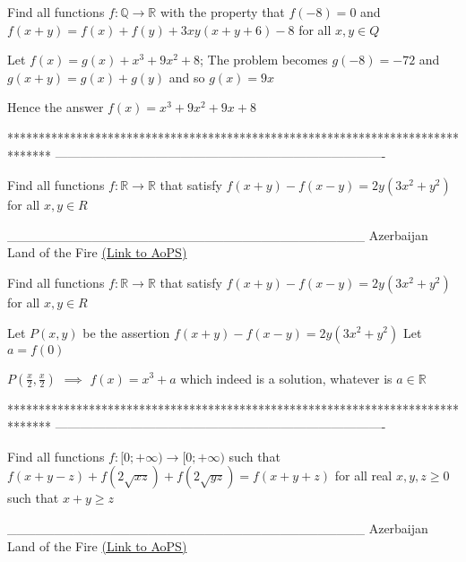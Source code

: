 \begin{solution}
	\begin{tcolorbox}Find all functions $f: \mathbb{Q}\to\mathbb{R}$ with the property  that $f(-8)=0$ and $f(x+y)=f(x)+f(y)+3xy(x+y+6)-8$ for all $x,y{\in}Q$\end{tcolorbox}
Let $f(x)=g(x)+x^3+9x^2+8$; The problem becomes $g(-8)=-72$ and $g(x+y)=g(x)+g(y)$ and so $g(x)=9x$

Hence the answer $\boxed{f(x)=x^3+9x^2+9x+8}$
\end{solution}
*******************************************************************************
-------------------------------------------------------------------------------

\begin{problem}
	Find all functions $f: \mathbb{R}\to\mathbb{R}$ that satisfy  $f(x+y)-f(x-y)=2y(3x^2+y^2)$ for all $x,y{\in}R$


______________________________________
Azerbaijan Land of the Fire 
	\flushright \href{https://artofproblemsolving.com/community/c6h533167}{(Link to AoPS)}
\end{problem}



\begin{solution}
	\begin{tcolorbox}Find all functions $f: \mathbb{R}\to\mathbb{R}$ that satisfy  $f(x+y)-f(x-y)=2y(3x^2+y^2)$ for all $x,y{\in}R$\end{tcolorbox}
Let $P(x,y)$ be the assertion $f(x+y)-f(x-y)=2y(3x^2+y^2)$
Let $a=f(0)$

$P(\frac x2,\frac x2)$ $\implies$ $\boxed{f(x)=x^3+a}$ which indeed is a solution, whatever is $a\in\mathbb R$
\end{solution}
*******************************************************************************
-------------------------------------------------------------------------------

\begin{problem}
	Find all functions ${{f: \mathbb[0;+\infty)}\to\mathbb[0;+\infty)}$ such that  $f(x+y-z)+f(2\sqrt{xz})+f(2\sqrt{yz})=f(x+y+z)$ for all real $x,y,z{\ge}0$ such that $x+y{\ge}z$


______________________________________
Azerbaijan Land of the Fire 
	\flushright \href{https://artofproblemsolving.com/community/c6h533451}{(Link to AoPS)}
\end{problem}



